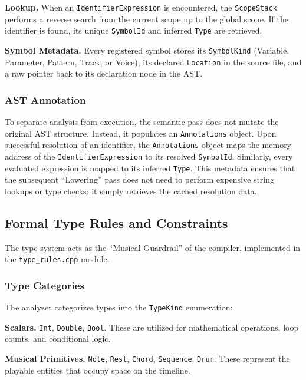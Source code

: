 \noindent \textbf{Lookup.} When an \texttt{IdentifierExpression} is encountered, the \texttt{ScopeStack} performs a
reverse search from the current scope up to the global scope.
If the identifier is found, its unique \texttt{SymbolId} and inferred \texttt{Type} are retrieved.

\noindent \textbf{Symbol Metadata.} Every registered symbol stores its \texttt{SymbolKind} (Variable,
  Parameter, Pattern,
Track, or Voice), its declared \texttt{Location} in the source file, and a raw pointer back to its declaration node
in the AST\@.

\subsubsection{AST Annotation}

To separate analysis from execution, the semantic pass does not mutate the original AST structure.
Instead, it populates an \texttt{Annotations} object.
Upon successful resolution of an identifier, the \texttt{Annotations} object maps the memory address of the
\texttt{IdentifierExpression} to its resolved \texttt{SymbolId}.
Similarly, every evaluated expression is mapped to its inferred \texttt{Type}.
This metadata ensures that the subsequent ``Lowering'' pass does not need to perform expensive string lookups or type
checks; it simply retrieves the cached resolution data.

\subsection{Formal Type Rules and Constraints}\label{detail-subsec:formal-type-rules-and-constraints}

The type system acts as the ``Musical Guardrail'' of the compiler, implemented in the \texttt{type\_rules.cpp} module.

\subsubsection{Type Categories}
The analyzer categorizes types into the \texttt{TypeKind} enumeration:

\noindent \textbf{Scalars.} \texttt{Int}, \texttt{Double}, \texttt{Bool}.
These are utilized for mathematical operations, loop counts, and conditional logic.

\noindent \textbf{Musical Primitives.} \texttt{Note}, \texttt{Rest}, \texttt{Chord}, \texttt{Sequence}, \texttt{Drum}.
These represent the playable entities that occupy space on the timeline.

